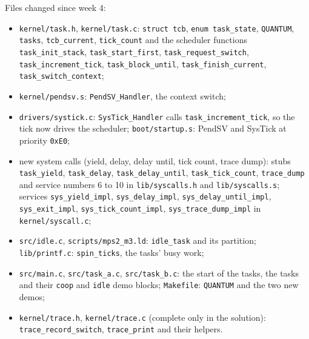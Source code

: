 Files changed since week 4:
\begin{itemize}
    \item \texttt{kernel/task.h}, \texttt{kernel/task.c}: \texttt{struct tcb}, \texttt{enum task\_state}, \texttt{QUANTUM}, \texttt{tasks}, \texttt{tcb\_current}, \texttt{tick\_count} and the scheduler functions \texttt{task\_init\_stack}, \texttt{task\_start\_first}, \texttt{task\_request\_switch}, \texttt{task\_increment\_tick}, \texttt{task\_block\_until}, \texttt{task\_finish\_current}, \texttt{task\_switch\_context};
    \item \texttt{kernel/pendsv.s}: \texttt{PendSV\_Handler}, the context switch;
    \item \texttt{drivers/systick.c}: \texttt{SysTick\_Handler} calls \texttt{task\_increment\_tick}, so the tick now drives the scheduler; \texttt{boot/startup.s}: PendSV and SysTick at priority \texttt{0xE0};
    \item new system calls (yield, delay, delay until, tick count, trace dump): stubs \texttt{task\_yield}, \texttt{task\_delay}, \texttt{task\_delay\_until}, \texttt{task\_tick\_count}, \texttt{trace\_dump} and service numbers 6 to 10 in \texttt{lib/syscalls.h} and \texttt{lib/syscalls.s}; services \texttt{sys\_yield\_impl}, \texttt{sys\_delay\_impl}, \texttt{sys\_delay\_until\_impl}, \texttt{sys\_exit\_impl}, \texttt{sys\_tick\_count\_impl}, \texttt{sys\_trace\_dump\_impl} in \texttt{kernel/syscall.c};
    \item \texttt{src/idle.c}, \texttt{scripts/mps2\_m3.ld}: \texttt{idle\_task} and its partition; \texttt{lib/printf.c}: \texttt{spin\_ticks}, the tasks' busy work;
    \item \texttt{src/main.c}, \texttt{src/task\_a.c}, \texttt{src/task\_b.c}: the start of the tasks, the tasks and their \texttt{coop} and \texttt{idle} demo blocks; \texttt{Makefile}: \texttt{QUANTUM} and the two new demos;
    \item \texttt{kernel/trace.h}, \texttt{kernel/trace.c} (complete only in the solution): \texttt{trace\_record\_switch}, \texttt{trace\_print} and their helpers.
\end{itemize}

